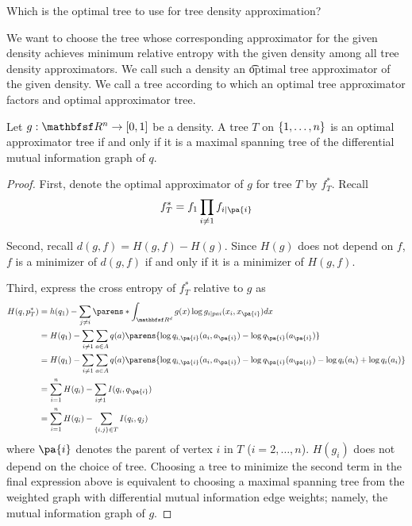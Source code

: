 
Which is the optimal tree to use for tree density approximation?


We want to choose the tree whose corresponding approximator for the given density achieves minimum relative entropy with the given density among all tree density approximators.
We call such a density an \t{optimal tree approximator} of the given density.
We call a tree according to which an optimal tree approximator factors and optimal approximator tree.


\begin{prop}

Let $g: \R^n \to [0, 1]$ be a density.
A tree $T$ on $\{1, \dots, n\}$ is an optimal approximator tree if and only if it is a maximal spanning tree of the differential mutual information graph of $q$.

\begin{proof}
First, denote the optimal approximator of $g$ for tree $T$ by $f^*_T$. Recall
$$
  f^*_T = f_1 \prod_{i \neq 1} f_{i \mid \pa{i}}
$$

Second, recall $d(g, f) = H(g, f) - H(g)$.
Since $H(g)$ does not depend on $f$, $f$ is a minimizer of $d(g, f)$ if and only if it is a minimizer of $H(g, f)$.

Third, express the cross entropy of $f^*_T$ relative to $g$ as
$$
\begin{aligned}
  H(q, p^*_T) &= h(q_1) - \sum_{j \neq i} \parens*{ \int_{\R^d} g(x) \log g_{i \mid pa{i}}(x_i, x_{\pa{i}}) dx } \\
              &= H(q_1) - \sum_{i \neq 1} \sum_{a \in A} q(a)\parens{\log q_{i,\pa{i}}(a_i, a_{\pa{i}}) - \log q_{\pa{i}}(a_{\pa{i}})} \\
              &= H(q_1) - \sum_{i \neq 1} \sum_{a \in A} q(a)\parens{\log q_{i,\pa{i}}(a_i, a_{\pa{i}}) - \log q_{\pa{i}}(a_{\pa{i}}) - \log q_i(a_i)  + \log q_{i}(a_i)} \\
              &= \sum_{i = 1}^{n} H(q_i) - \sum_{i \neq 1} I(q_i, q_{\pa{i}}) \\
              &= \sum_{i = 1}^{n} H(q_i) - \sum_{\set{i,j} \in T} I(q_i, q_{j}) \\
\end{aligned}
$$
where $\pa{i}$ denotes the parent of vertex $i$ in $T$ ($i = 2, \dots, n$).
$H(g_i)$ does not depend on the choice of tree.
Choosing a tree to minimize the second term in the final expression above is equivalent to choosing a maximal spanning tree from the weighted graph with differential mutual information edge weights; namely, the mutual information graph of $g$.

\end{proof}

\end{prop}
\strats
